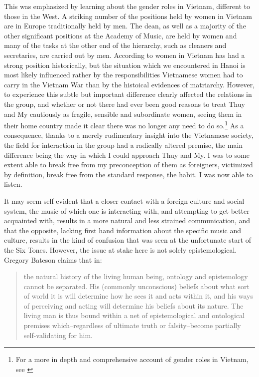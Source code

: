 \documentclass[a4paper]{article}
\begin{document}
This was emphasized by learning about the gender roles in Vietnam, different to those in the West. A striking number of the positions held by women in Vietnam are in Europe traditionally held by men. The dean, as well as a majority of the other significant positions at the Academy of Music, are held by women and many of the tasks at the other end of the hierarchy, such as cleaners and secretaries, are carried out by men. According to \citet{VanKy2002} women in Vietnam has had a strong position historically, but the situation which we encountered in Hanoi is most likely influenced rather by the responsibilities Vietnamese women had to carry in the Vietnam War than by the histoical evidences of matriarchy. However, to experience this subtle but important difference clearly affected the relations in the group, and whether or not there had ever been good reasons to treat Thuy and My cautiously as fragile, sensible and subordinate women, seeing them in their home country made it clear there was no longer any need to do so.\footnote{For a more in depth and comprehensive account of gender roles in Vietnam, see \citet{drummond2004}} As a consequence, thanks to a merely rudimentary insight into the Vietnamese society, the field for interaction in the group had a radically altered premise, the main difference being the way in which I could approach Thuy and My. I was to some extent able to break free from my preconception of them as foreigners, victimized by definition, break free from the standard response, the habit. I was now able to listen.

It may seem self evident that a closer contact with a foreign culture and social system, the music of which one is interacting with, and attempting to get better acquainted with, results in a more natural and less strained communication, and that the opposite, lacking first hand information about the specific music and culture, results in the kind of confusion that was seen at the unfortunate start of the Six Tones. However, the issue at stake here is not solely epistemological. Gregory Bateson claims that in: 
\begin{quote}
  the natural history of the living human being, ontology and epistemology
  cannot be separated. His (commonly unconscious) beliefs about what sort of
  world it is will determine how he sees it and acts within it, and his ways
  of perceiving and acting will determine his beliefs about its nature. The
  living man is thus bound within a net of epistemological and ontological
  premises which--regardless of ultimate truth or falsity--become partially
  self-validating for him. \citep[p. 314]{bateson72:steps}
\end{quote}
\end{document}
